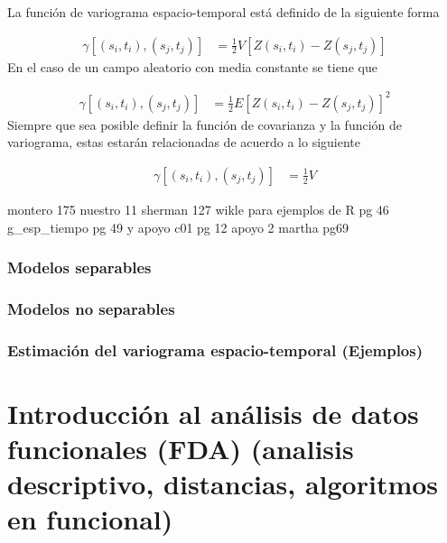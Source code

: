 \documentclass[
]{book}
\begin{document}
La función de variograma espacio-temporal está definido de la siguiente forma

\[
\begin{align*}
\gamma[(s_i,t_i),(s_j,t_j)]&=\frac{1}{2}V[Z(s_i,t_i)-Z(s_j,t_j)]
\end{align*}
\]
En el caso de un campo aleatorio con media constante se tiene que

\[
\begin{align*}
\gamma[(s_i,t_i),(s_j,t_j)]&=\frac{1}{2}E[Z(s_i,t_i)-Z(s_j,t_j)]^2
\end{align*}
\]
Siempre que sea posible definir la función de covarianza y la función de variograma, estas estarán relacionadas de acuerdo a lo siguiente

\[
\begin{align*}
\gamma[(s_i,t_i),(s_j,t_j)]&=\frac{1}{2}V
\end{align*}
\]

montero 175
nuestro 11
sherman 127
wikle para ejemplos de R pg 46
g\_esp\_tiempo pg 49 y
apoyo c01 pg 12
apoyo 2 martha pg69

\hypertarget{modelos-separables}{%
\subsection{Modelos separables}\label{modelos-separables}}

\hypertarget{modelos-no-separables}{%
\subsection{Modelos no separables}\label{modelos-no-separables}}

\hypertarget{estimaciuxf3n-del-variograma-espacio-temporal-ejemplos}{%
\subsection{Estimación del variograma espacio-temporal (Ejemplos)}\label{estimaciuxf3n-del-variograma-espacio-temporal-ejemplos}}

\hypertarget{introducciuxf3n-al-anuxe1lisis-de-datos-funcionales-fda-analisis-descriptivo-distancias-algoritmos-en-funcional}{%
\chapter{Introducción al análisis de datos funcionales (FDA) (analisis descriptivo, distancias, algoritmos en funcional)}\label{introducciuxf3n-al-anuxe1lisis-de-datos-funcionales-fda-analisis-descriptivo-distancias-algoritmos-en-funcional}}
\end{document}
